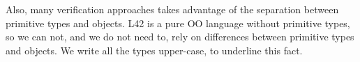 

Also, many verification approaches takes advantage of the separation between primitive types and objects.
L42 is a pure OO language without primitive types, so we can not, and we do not need to, rely
on differences between primitive types and objects.
We write all the types upper-case, to underline this fact.


